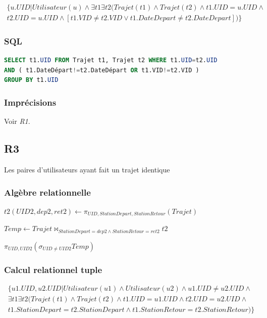 \documentclass[a4paper, 12pt]{report}
\begin{document}
\begin{multline*}
\{ u.UID|Utilisateur(u)\wedge\exists t1\exists t2 ( Trajet(t1)\wedge Trajet(t2)\wedge t1.UID=u.UID\wedge \\
t2.UID=u.UID \wedge [t1.VID\neq t2.VID\vee t1.DateDepart\neq t2.DateDepart] )  \}
\end{multline*}

\subsubsection*{SQL}
\begin{lstlisting}[language=sql]
SELECT t1.UID FROM Trajet t1, Trajet t2 WHERE t1.UID=t2.UID
AND ( t1.DateDépart!=t2.DateDépart OR t1.VID!=t2.VID ) 
GROUP BY t1.UID
\end{lstlisting}

\subsubsection*{Imprécisions}

Voir \textit{R1}.

\subsection*{R3}

Les paires d'utilisateurs ayant fait un trajet identique
\subsubsection*{Algèbre relationnelle}

$t2(UID2,dep2,ret2)\leftarrow\pi_{UID,StationDepart,StationRetour}(Trajet)$

$Temp\leftarrow Trajet\bowtie_{StationDepart=dep2\wedge StationRetour=ret2}t2$

$\pi_{UID,UID2}(\sigma_{UID\neq UID2} Temp)$

\subsubsection*{Calcul relationnel tuple}

\begin{multline*}
\{  u1.UID, u2.UID |Utilisateur(u1)\wedge Utilisateur(u2)\wedge u1.UID \neq u2.UID\wedge \\
\exists t1\exists t2 ( Trajet(t1)\wedge Trajet(t2) \wedge
 t1.UID=u1.UID \wedge t2.UID=u2.UID \wedge \\
  t1.StationDepart=t2.StationDepart \wedge t1.StationRetour=t2.StationRetour )  \}
\end{multline*}
\end{document}
